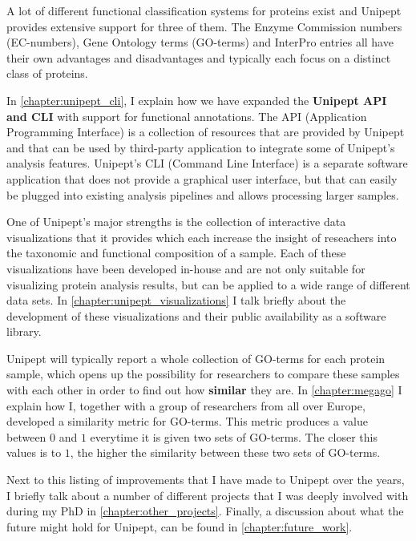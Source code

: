 A lot of different functional classification systems for proteins exist and Unipept provides extensive support for three of them.
The Enzyme Commission numbers (EC-numbers), Gene Ontology terms (GO-terms) and InterPro entries all have their own advantages and disadvantages and typically each focus on a distinct class of proteins.

In \autoref{chapter:unipept_cli}, I explain how we have expanded the \textbf{Unipept API and CLI} with support for functional annotations.
The API (Application Programming Interface) is a collection of resources that are provided by Unipept and that can be used by third-party application to integrate some of Unipept's analysis features.
Unipept's CLI (Command Line Interface) is a separate software application that does not provide a graphical user interface, but that can easily be plugged into existing analysis pipelines and allows processing larger samples.

One of Unipept's major strengths is the collection of interactive data visualizations that it provides which each increase the insight of reseachers into the taxonomic and functional composition of a sample.
Each of these visualizations have been developed in-house and are not only suitable for visualizing protein analysis results, but can be applied to a wide range of different data sets.
In \autoref{chapter:unipept_visualizations} I talk briefly about the development of these visualizations and their public availability as a software library.

Unipept will typically report a whole collection of GO-terms for each protein sample, which opens up the possibility for researchers to compare these samples with each other in order to find out how \textbf{similar} they are.
In \autoref{chapter:megago} I explain how I, together with a group of researchers from all over Europe, developed a similarity metric for GO-terms.
This metric produces a value between $0$ and $1$ everytime it is given two sets of GO-terms.
The closer this values is to $1$, the higher the similarity between these two sets of GO-terms.

Next to this listing of improvements that I have made to Unipept over the years, I briefly talk about a number of different projects that I was deeply involved with during my PhD in \autoref{chapter:other_projects}.
Finally, a discussion about what the future might hold for Unipept, can be found in \autoref{chapter:future_work}.

